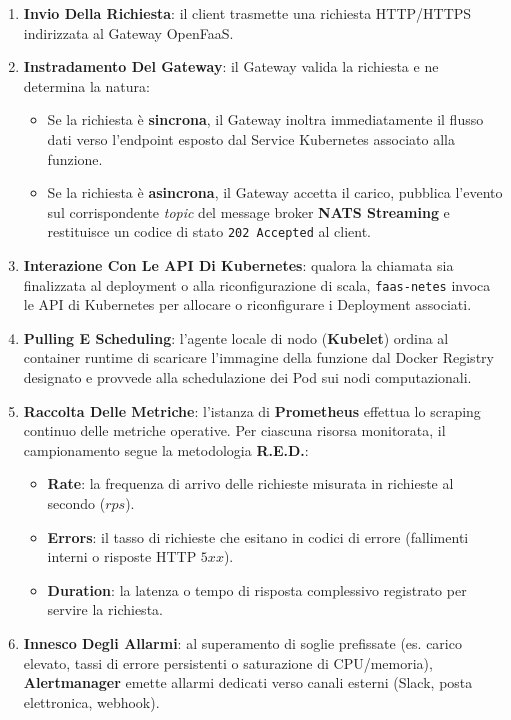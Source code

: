\documentclass[11pt, a4paper]{article}
\begin{document}
\begin{enumerate}
    \item \textbf{Invio Della Richiesta}: il client trasmette una richiesta HTTP/HTTPS indirizzata al Gateway OpenFaaS.
    \item \textbf{Instradamento Del Gateway}: il Gateway valida la richiesta e ne determina la natura:
    \begin{itemize}
        \item Se la richiesta è \textbf{sincrona}, il Gateway inoltra immediatamente il flusso dati verso l'endpoint esposto dal Service Kubernetes associato alla funzione.
        \item Se la richiesta è \textbf{asincrona}, il Gateway accetta il carico, pubblica l'evento sul corrispondente \emph{topic} del message broker \textbf{NATS Streaming} e restituisce un codice di stato \texttt{202 Accepted} al client.
    \end{itemize}
    \item \textbf{Interazione Con Le API Di Kubernetes}: qualora la chiamata sia finalizzata al deployment o alla riconfigurazione di scala, \texttt{faas-netes} invoca le API di Kubernetes per allocare o riconfigurare i Deployment associati.
    \item \textbf{Pulling E Scheduling}: l'agente locale di nodo (\textbf{Kubelet}) ordina al container runtime di scaricare l'immagine della funzione dal Docker Registry designato e provvede alla schedulazione dei Pod sui nodi computazionali.
    \item \textbf{Raccolta Delle Metriche}: l'istanza di \textbf{Prometheus} effettua lo scraping continuo delle metriche operative. Per ciascuna risorsa monitorata, il campionamento segue la metodologia \textbf{R.E.D.}:
    \begin{itemize}
        \item \textbf{Rate}: la frequenza di arrivo delle richieste misurata in richieste al secondo ($rps$).
        \item \textbf{Errors}: il tasso di richieste che esitano in codici di errore (fallimenti interni o risposte HTTP $5xx$).
        \item \textbf{Duration}: la latenza o tempo di risposta complessivo registrato per servire la richiesta.
    \end{itemize}
    \item \textbf{Innesco Degli Allarmi}: al superamento di soglie prefissate (es. carico elevato, tassi di errore persistenti o saturazione di CPU/memoria), \textbf{Alertmanager} emette allarmi dedicati verso canali esterni (Slack, posta elettronica, webhook).

\end{enumerate}
\end{document}
